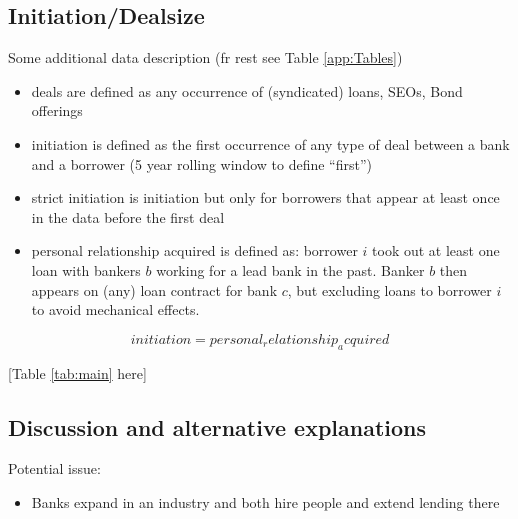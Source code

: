 
\subsection{Initiation/Dealsize}
\label{sec:initiation}

Some additional data description (fr rest see Table \ref{app:Tables})
\begin{itemize}

	\item deals are defined as any occurrence of (syndicated) loans, SEOs, Bond offerings
	\item initiation is defined as the first occurrence of any type of deal between a bank and a borrower (5 year rolling window to define ``first'')
	\item  strict initiation is initiation but only for borrowers that appear at least once in the data before the first deal
	\item personal relationship acquired is defined as: borrower $i$ took out at least one loan with bankers $b$ working for a lead bank in the past. Banker $b$ then appears on (any) loan contract for bank $c$, but excluding loans to borrower $i$ to avoid mechanical effects. 
\end{itemize}


\begin{equation}
initiation = personal_relationship_acquired \label{eq:initiation}
\end{equation}

\begin{center}
	[Table \ref{tab:main} here]
\end{center}


\subsection{Discussion and alternative explanations}

Potential issue:
\begin{itemize}
	\item Banks expand in an industry and both hire people and extend lending there
\end{itemize}

%
%
%
